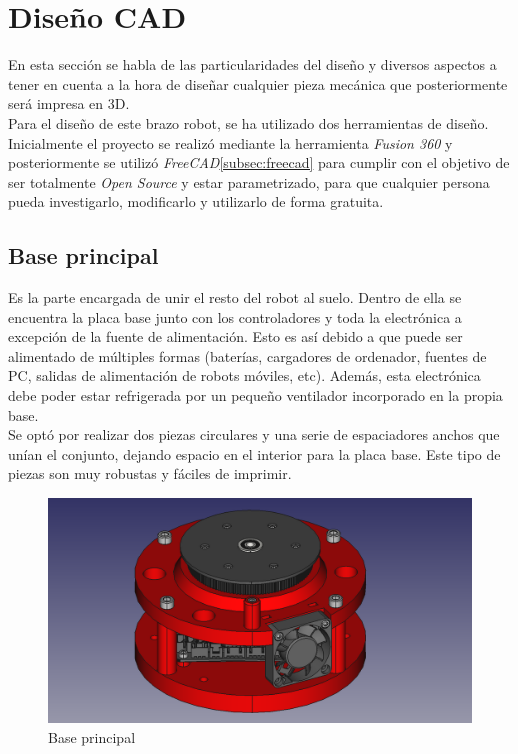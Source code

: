 \newpage
\section{Diseño CAD}
\label{sec:di_cad}
\noindent En esta sección se habla de las particularidades del diseño y diversos aspectos a tener en cuenta a la hora de diseñar 
cualquier pieza mecánica que posteriormente será impresa en 3D. 
\\
\indent Para el diseño de este brazo robot, se ha utilizado dos herramientas de diseño. Inicialmente el proyecto se realizó mediante 
la herramienta \textit{Fusion 360} y posteriormente se utilizó \textit{FreeCAD}\ref{subsec:freecad} para cumplir con el objetivo de ser totalmente 
\textit{Open Source} y estar parametrizado, para que cualquier persona pueda investigarlo, modificarlo y utilizarlo de forma gratuita.

\subsection{Base principal}
\noindent Es la parte encargada de unir el resto del robot al suelo. Dentro de ella se encuentra la placa base junto con los controladores 
y toda la electrónica a excepción de la fuente de alimentación. Esto es así debido a que puede ser alimentado de múltiples formas (baterías, 
cargadores de ordenador, fuentes de PC, salidas de alimentación de robots móviles, etc). Además, esta electrónica debe poder estar refrigerada 
por un pequeño ventilador incorporado en la propia base. \\
\indent Se optó por realizar dos piezas circulares y una serie de espaciadores anchos que unían el conjunto, dejando espacio en el interior para 
la placa base. Este tipo de piezas son muy robustas y fáciles de imprimir. 
\begin{figure} [ht!]
  \begin{center}
    \includegraphics[width=12cm]{figs/base_principal.png}
  \end{center}
  \caption{Base principal}
\end{figure}\ 

